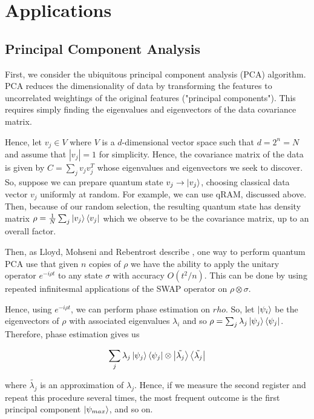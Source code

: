 \documentclass[main.tex]{subfiles}
\begin{document}
\section{Applications}

\subsection{Principal Component Analysis}

First, we consider the ubiquitous principal component analysis (PCA) algorithm. PCA reduces the dimensionality of data by transforming the features to uncorrelated weightings of the original features ("principal components"). This requires simply finding the eigenvalues and eigenvectors of the data covariance matrix. 

Hence, let $v_j \in V$ where $V$ is a $d$-dimensional vector space such that $d=2^n=N$ and assume that $|v_j| = 1$ for simplicity. Hence, the covariance matrix of the data is given by $C = \sum_j v_jv_j^T$ whose eigenvalues and eigenvectors we seek to discover. So, suppose we can prepare quantum state $v_j \rightarrow \ket{v_j}$, choosing classical data vector $v_j$ uniformly at random. For example, we can use qRAM, discussed above. Then, because of our random selection, the resulting quantum state has density matrix $\rho = \frac{1}{N} \sum_j \ket{v_j}\bra{v_j}$ which we observe to be the covariance matrix, up to an overall factor. 

Then, as Lloyd, Mohseni and Rebentrost describe \cite{lloyd2014quantum}, one way to perform quantum PCA use that given $n$ copies of $\rho$ we have the ability to apply the unitary operator $e^{-i\rho t}$ to any state $\sigma$ with accuracy $O(t^2 / n)$. This can be done by using repeated infinitesmal applications of the SWAP operator on $\rho \otimes \sigma$. 

Hence, using $e^{-i \rho t}$, we can perform phase estimation on $rho$. So, let $\ket{\psi_i}$ be the eigenvectors of $\rho$ with associated eigenvalues $\lambda_i$ and so $\rho = \sum_j \lambda_j \ket{\psi_j}\bra{\psi_j}$. Therefore, phase estimation gives us

\begin{align*}
\sum_j \lambda_j \ket{\psi_j}\bra{\psi_j} \otimes \ket{\tilde{\lambda_j}} \bra{\tilde{\lambda_j}}
\end{align*}

where $\tilde{\lambda_j}$ is an approximation of $\lambda_j$. Hence, if we measure the second register and repeat this procedure several times, the most frequent outcome is the first principal component $\ket{\psi_{max}}$, and so on.
\end{document}
